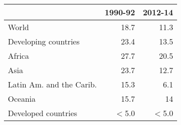\footnotesize
\begin{center}
\begin{tabular}{lrr}
\toprule
  & 1990-92 & 2012-14\\
\midrule
World & 18.7 & 11.3\\
Developing
countries & 23.4 & 13.5\\
Africa & 27.7 & 20.5\\
Asia & 23.7 & 12.7\\
Latin Am. and the Carib. & 15.3 & 6.1\\
Oceania & 15.7 & 14\\
Developed
countries & $<$5.0 & $<$5.0\\
\toprule
\end{tabular}
\end{center}
